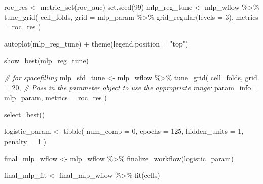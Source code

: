 \documentclass[
]{book}
\newenvironment{Shaded}{\begin{snugshade}}{\end{snugshade}}
\newcommand{\AttributeTok}[1]{\textcolor[rgb]{0.77,0.63,0.00}{#1}}
\newcommand{\CommentTok}[1]{\textcolor[rgb]{0.56,0.35,0.01}{\textit{#1}}}
\newcommand{\DecValTok}[1]{\textcolor[rgb]{0.00,0.00,0.81}{#1}}
\newcommand{\FunctionTok}[1]{\textcolor[rgb]{0.00,0.00,0.00}{#1}}
\newcommand{\NormalTok}[1]{#1}
\newcommand{\OtherTok}[1]{\textcolor[rgb]{0.56,0.35,0.01}{#1}}
\newcommand{\SpecialCharTok}[1]{\textcolor[rgb]{0.00,0.00,0.00}{#1}}
\newcommand{\StringTok}[1]{\textcolor[rgb]{0.31,0.60,0.02}{#1}}
\begin{document}
\begin{Shaded}
\begin{Highlighting}[]
\NormalTok{roc\_res }\OtherTok{\textless{}{-}} \FunctionTok{metric\_set}\NormalTok{(roc\_auc)}
\FunctionTok{set.seed}\NormalTok{(}\DecValTok{99}\NormalTok{)}
\NormalTok{mlp\_reg\_tune }\OtherTok{\textless{}{-}}
\NormalTok{  mlp\_wflow }\SpecialCharTok{\%\textgreater{}\%}
  \FunctionTok{tune\_grid}\NormalTok{(}
\NormalTok{    cell\_folds,}
    \AttributeTok{grid =}\NormalTok{ mlp\_param }\SpecialCharTok{\%\textgreater{}\%} \FunctionTok{grid\_regular}\NormalTok{(}\AttributeTok{levels =} \DecValTok{3}\NormalTok{),}
    \AttributeTok{metrics =}\NormalTok{ roc\_res}
\NormalTok{  )}

\FunctionTok{autoplot}\NormalTok{(mlp\_reg\_tune) }\SpecialCharTok{+} \FunctionTok{theme}\NormalTok{(}\AttributeTok{legend.position =} \StringTok{"top"}\NormalTok{)}

\FunctionTok{show\_best}\NormalTok{(mlp\_reg\_tune)}

\CommentTok{\# for spacefilling}
\NormalTok{mlp\_sfd\_tune }\OtherTok{\textless{}{-}}
\NormalTok{  mlp\_wflow }\SpecialCharTok{\%\textgreater{}\%}
  \FunctionTok{tune\_grid}\NormalTok{(}
\NormalTok{    cell\_folds,}
    \AttributeTok{grid =} \DecValTok{20}\NormalTok{,}
    \CommentTok{\# Pass in the parameter object to use the appropriate range: }
    \AttributeTok{param\_info =}\NormalTok{ mlp\_param,}
    \AttributeTok{metrics =}\NormalTok{ roc\_res}
\NormalTok{  )}

\FunctionTok{select\_best}\NormalTok{()}
\end{Highlighting}
\end{Shaded}

\begin{Shaded}
\begin{Highlighting}[]
\NormalTok{logistic\_param }\OtherTok{\textless{}{-}} 
  \FunctionTok{tibble}\NormalTok{(}
    \AttributeTok{num\_comp =} \DecValTok{0}\NormalTok{,}
    \AttributeTok{epochs =} \DecValTok{125}\NormalTok{,}
    \AttributeTok{hidden\_units =} \DecValTok{1}\NormalTok{,}
    \AttributeTok{penalty =} \DecValTok{1}
\NormalTok{  )}

\NormalTok{final\_mlp\_wflow }\OtherTok{\textless{}{-}} 
\NormalTok{  mlp\_wflow }\SpecialCharTok{\%\textgreater{}\%} 
  \FunctionTok{finalize\_workflow}\NormalTok{(logistic\_param)}

\NormalTok{final\_mlp\_fit }\OtherTok{\textless{}{-}} 
\NormalTok{  final\_mlp\_wflow }\SpecialCharTok{\%\textgreater{}\%} 
  \FunctionTok{fit}\NormalTok{(cells)}
\end{Highlighting}
\end{Shaded}
\end{document}
